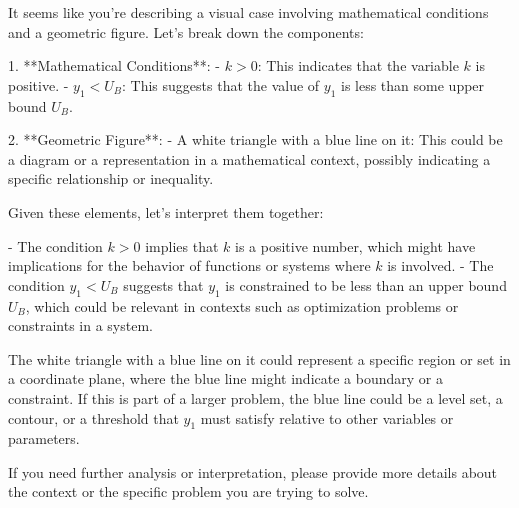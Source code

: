 It seems like you're describing a visual case involving mathematical conditions and a geometric figure. Let's break down the components:

1. **Mathematical Conditions**:
   - \( k > 0 \): This indicates that the variable \( k \) is positive.
   - \( y_1 < U_B \): This suggests that the value of \( y_1 \) is less than some upper bound \( U_B \).

2. **Geometric Figure**:
   - A white triangle with a blue line on it: This could be a diagram or a representation in a mathematical context, possibly indicating a specific relationship or inequality.

Given these elements, let's interpret them together:

- The condition \( k > 0 \) implies that \( k \) is a positive number, which might have implications for the behavior of functions or systems where \( k \) is involved.
- The condition \( y_1 < U_B \) suggests that \( y_1 \) is constrained to be less than an upper bound \( U_B \), which could be relevant in contexts such as optimization problems or constraints in a system.

The white triangle with a blue line on it could represent a specific region or set in a coordinate plane, where the blue line might indicate a boundary or a constraint. If this is part of a larger problem, the blue line could be a level set, a contour, or a threshold that \( y_1 \) must satisfy relative to other variables or parameters.

If you need further analysis or interpretation, please provide more details about the context or the specific problem you are trying to solve.